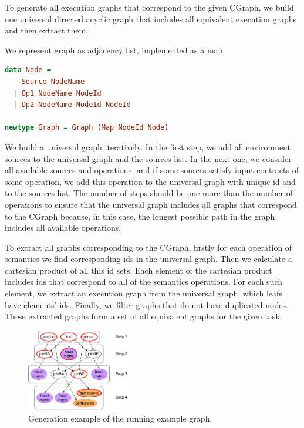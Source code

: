 To generate all execution graphs that correspond to the given CGraph, we build one universal directed acyclic graph that includes all equivalent execution graphs and then extract them.

We represent graph as adjacency list, implemented as a map:

\begin{lstlisting}[language=Haskell]
data Node =
    Source NodeName
  | Op1 NodeName NodeId
  | Op2 NodeName NodeId NodeId

newtype Graph = Graph (Map NodeId Node)
\end{lstlisting}


We build a universal graph iteratively.
In the first step, we add all environment sources to the universal graph and the sources list.
In the next one, we consider all available sources and operations, and if some sources satisfy input contracts of some operation, we add this operation to the universal graph with unique id and to the sources list.
The number of steps should be one more than the number of operations to ensure that the universal graph includes all graphs that correspond to the CGraph because, in this case, the longest possible path in the graph includes all available operations.

To extract all graphs corresponding to the CGraph, firstly for each operation of semantics we find corresponding ids in the universal graph.
Then we calculate a cartesian product of all this id sets.
Each element of the cartesian product includes ids that correspond to all of the semantics operations.
For each such element, we extract an execution graph from the universal graph, which leafs have elements' ids.
Finally, we filter graphs that do not have duplicated nodes.
These extracted graphs form a set of all equivalent graphs for the given task.

\begin{figure}
    \flushright
    \includegraphics[width=0.4\textwidth]{images/generation}
    \caption{Generation example of the running example graph.}
    \label{fig:gen}
\end{figure}

